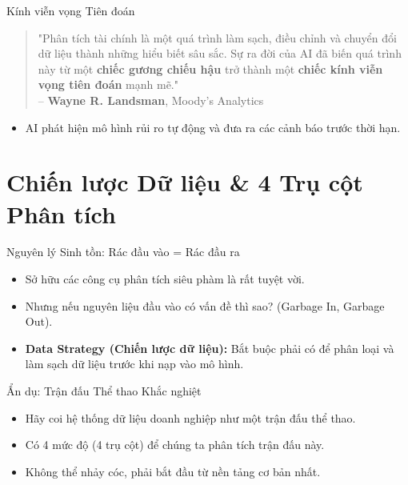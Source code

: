 \documentclass[aspectratio=169,12pt]{beamer}
\begin{document}
\begin{frame}{Kính viễn vọng Tiên đoán}
    \begin{quote}
        "Phân tích tài chính là một quá trình làm sạch, điều chỉnh và chuyển đổi dữ liệu thành những hiểu biết sâu sắc. Sự ra đời của AI đã biến quá trình này từ một \textbf{chiếc gương chiếu hậu} trở thành một \textbf{chiếc kính viễn vọng tiên đoán} mạnh mẽ."\\
        \vspace{0.2cm}
        -- \textbf{Wayne R. Landsman}, Moody’s Analytics
    \end{quote}
    \begin{itemize}
        \item AI phát hiện mô hình rủi ro tự động và đưa ra các cảnh báo trước thời hạn.
    \end{itemize}
\end{frame}


\section{Chiến lược Dữ liệu \& 4 Trụ cột Phân tích}
\begin{frame}
    \tableofcontents[currentsection]
\end{frame}

\begin{frame}{Nguyên lý Sinh tồn: Rác đầu vào = Rác đầu ra}
    \begin{itemize}
        \item Sở hữu các công cụ phân tích siêu phàm là rất tuyệt vời.
        \item Nhưng nếu nguyên liệu đầu vào có vấn đề thì sao? (Garbage In, Garbage Out).
        \item \textbf{Data Strategy (Chiến lược dữ liệu):} Bắt buộc phải có để phân loại và làm sạch dữ liệu trước khi nạp vào mô hình.
    \end{itemize}
\end{frame}

\begin{frame}{Ẩn dụ: Trận đấu Thể thao Khắc nghiệt}
    \begin{itemize}
        \item Hãy coi hệ thống dữ liệu doanh nghiệp như một trận đấu thể thao.
        \item Có 4 mức độ (4 trụ cột) để chúng ta phân tích trận đấu này.
        \item Không thể nhảy cóc, phải bắt đầu từ nền tảng cơ bản nhất.
    \end{itemize}
\end{frame}
\end{document}
